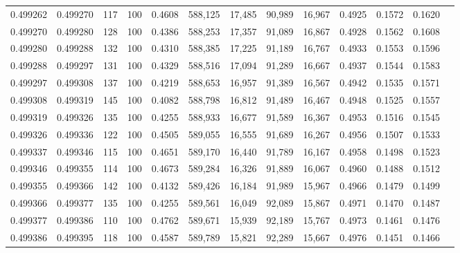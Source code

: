 \begin{tabular}{rrrrrrrrrrrrr}
0.499262 & 0.499270 &   117 & 100 &                                     0.4608 & 588,125 &  17,485 &  90,989 &  16,967 & 0.4925 & 0.1572 & 0.1620 \\
0.499270 & 0.499280 &   128 & 100 &                                     0.4386 & 588,253 &  17,357 &  91,089 &  16,867 & 0.4928 & 0.1562 & 0.1608 \\
0.499280 & 0.499288 &   132 & 100 &                                     0.4310 & 588,385 &  17,225 &  91,189 &  16,767 & 0.4933 & 0.1553 & 0.1596 \\
0.499288 & 0.499297 &   131 & 100 &                                     0.4329 & 588,516 &  17,094 &  91,289 &  16,667 & 0.4937 & 0.1544 & 0.1583 \\
0.499297 & 0.499308 &   137 & 100 &                                     0.4219 & 588,653 &  16,957 &  91,389 &  16,567 & 0.4942 & 0.1535 & 0.1571 \\
0.499308 & 0.499319 &   145 & 100 &                                     0.4082 & 588,798 &  16,812 &  91,489 &  16,467 & 0.4948 & 0.1525 & 0.1557 \\
0.499319 & 0.499326 &   135 & 100 &                                     0.4255 & 588,933 &  16,677 &  91,589 &  16,367 & 0.4953 & 0.1516 & 0.1545 \\
0.499326 & 0.499336 &   122 & 100 &                                     0.4505 & 589,055 &  16,555 &  91,689 &  16,267 & 0.4956 & 0.1507 & 0.1533 \\
0.499337 & 0.499346 &   115 & 100 &                                     0.4651 & 589,170 &  16,440 &  91,789 &  16,167 & 0.4958 & 0.1498 & 0.1523 \\
0.499346 & 0.499355 &   114 & 100 &                                     0.4673 & 589,284 &  16,326 &  91,889 &  16,067 & 0.4960 & 0.1488 & 0.1512 \\
0.499355 & 0.499366 &   142 & 100 &                                     0.4132 & 589,426 &  16,184 &  91,989 &  15,967 & 0.4966 & 0.1479 & 0.1499 \\
0.499366 & 0.499377 &   135 & 100 &                                     0.4255 & 589,561 &  16,049 &  92,089 &  15,867 & 0.4971 & 0.1470 & 0.1487 \\
0.499377 & 0.499386 &   110 & 100 &                                     0.4762 & 589,671 &  15,939 &  92,189 &  15,767 & 0.4973 & 0.1461 & 0.1476 \\
0.499386 & 0.499395 &   118 & 100 &                                     0.4587 & 589,789 &  15,821 &  92,289 &  15,667 & 0.4976 & 0.1451 & 0.1466 \\

\end{tabular}
